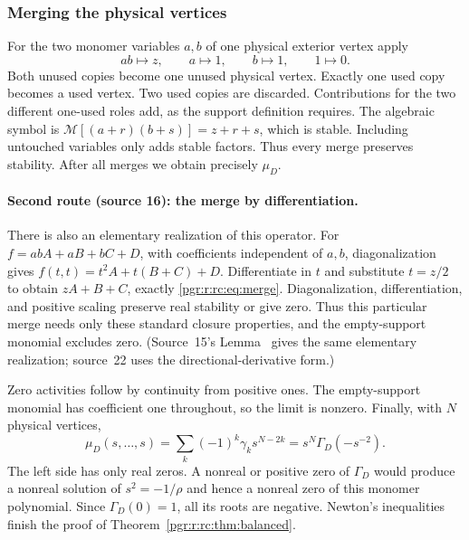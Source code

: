 \documentclass[11pt]{article}
\makeatletter
\numberwithin{equation}{section}
\theoremstyle{definition}\newtheorem{definition}[theorem]{Definition}\newtheorem{remark}[theorem]{Remark}
\newcommand{\Ga}{\Gamma}                   %
\newcommand{\pgrfwd}[2]{\@ifundefined{r@#1}{#2}{\ref{#1}}}
\makeatother
\begin{document}
\subsubsection{Merging the physical vertices}
For the two monomer variables $a,b$ of one physical exterior vertex apply
\begin{equation}\label{pgr:r:rc:eq:merge}
 ab\longmapsto z,\qquad a\longmapsto1,\qquad b\longmapsto1,
 \qquad1\longmapsto0.
\end{equation}
Both unused copies become one unused physical vertex. Exactly one used copy becomes a used vertex. Two used copies are discarded. Contributions for the two different one-used roles add, as the support definition requires. The algebraic symbol is
$\mathcal M[(a+r)(b+s)]=z+r+s$, which is stable. Including untouched variables only adds stable factors. Thus every merge preserves stability. After all merges we obtain precisely $\mu_D$.

\paragraph{Second route (source 16): the merge by differentiation.} There
is also an elementary realization of this operator. For $f=abA+aB+bC+D$,
with coefficients independent of $a,b$, diagonalization gives
$f(t,t)=t^2A+t(B+C)+D$. Differentiate in $t$ and substitute $t=z/2$ to
obtain $zA+B+C$, exactly \eqref{pgr:r:rc:eq:merge}. Diagonalization,
differentiation, and positive scaling preserve real stability or give
zero. Thus this particular merge needs only these standard closure
properties, and the empty-support monomial excludes zero. (Source~15's
Lemma~\pgrfwd{pgr:r:ps:lem:merge}{``Core merge''} gives the same elementary
realization; source~22 uses the directional-derivative form.)


Zero activities follow by continuity from positive ones. The empty-support monomial has coefficient one throughout, so the limit is nonzero. Finally, with $N$ physical vertices,
\[
 \mu_D(s,\ldots,s)=\sum_k(-1)^k\gamma_k s^{N-2k}
                  =s^N\Ga_D(-s^{-2}).
\]
The left side has only real zeros. A nonreal or positive zero of $\Ga_D$ would produce a nonreal solution of $s^2=-1/\rho$ and hence a nonreal zero of this monomer polynomial. Since $\Ga_D(0)=1$, all its roots are negative. Newton's inequalities finish the proof of Theorem~\ref{pgr:r:rc:thm:balanced}.
\end{document}
